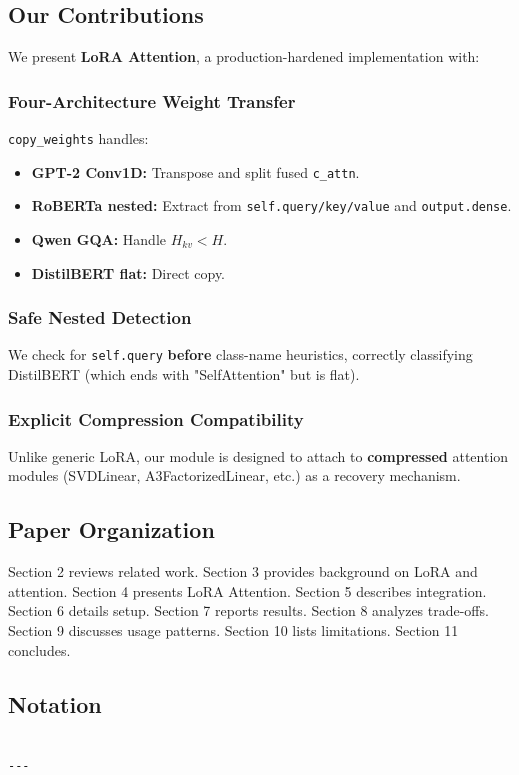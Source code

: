 \subsection{Our Contributions}

We present \textbf{LoRA Attention}, a production-hardened implementation with:

\subsubsection{Four-Architecture Weight Transfer}

\texttt{copy\_weights} handles:
\begin{itemize}
\item \textbf{GPT-2 Conv1D:} Transpose and split fused \texttt{c\_attn}.
\item \textbf{RoBERTa nested:} Extract from \texttt{self.query/key/value} and \texttt{output.dense}.
\item \textbf{Qwen GQA:} Handle $H_{kv} < H$.
\item \textbf{DistilBERT flat:} Direct copy.

\end{itemize}
\subsubsection{Safe Nested Detection}

We check for \texttt{self.query} \textbf{before} class-name heuristics, correctly 
classifying DistilBERT (which ends with "SelfAttention" but is flat).

\subsubsection{Explicit Compression Compatibility}

Unlike generic LoRA, our module is designed to attach to \textbf{compressed} 
attention modules (SVDLinear, A3FactorizedLinear, etc.) as a recovery 
mechanism.

\subsection{Paper Organization}

Section 2 reviews related work. Section 3 provides background on LoRA and 
attention. Section 4 presents LoRA Attention. Section 5 describes 
integration. Section 6 details setup. Section 7 reports results. Section 8 
analyzes trade-offs. Section 9 discusses usage patterns. Section 10 lists 
limitations. Section 11 concludes.



\subsection{Notation}

\begin{lstlisting}

---
\end{lstlisting}